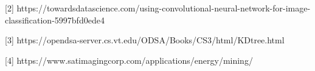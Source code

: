 \documentclass[10pt]{article}
\begin{document}
[2] https://towardsdatascience.com/using-convolutional-neural-network-for-image-classification-5997bfd0ede4

[3] https://opendsa-server.cs.vt.edu/ODSA/Books/CS3/html/KDtree.html

[4] https://www.satimagingcorp.com/applications/energy/mining/




\end{document}
